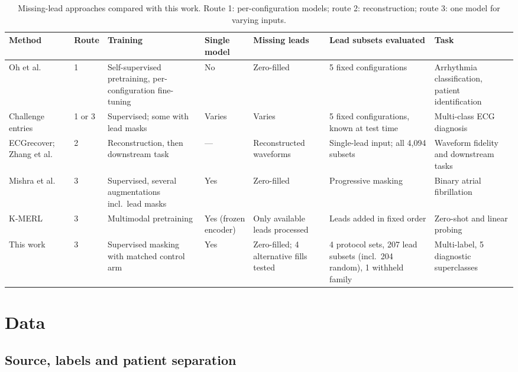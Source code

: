 \begin{table}[htbp]
\centering\footnotesize
\caption{Missing-lead approaches compared with this work. Route 1: per-configuration models; route 2: reconstruction; route 3: one model for varying inputs.}
\label{tab:related}
\setlength{\tabcolsep}{3pt}
\begin{tabular}{L{2.1cm}L{0.8cm}L{2.1cm}L{1.2cm}L{1.9cm}L{2.3cm}L{1.9cm}}
\toprule
Method & Route & Training & Single model & Missing leads & Lead subsets evaluated & Task \\
\midrule
Oh et al.\ \citep{oh2022leadagnostic} & 1 & Self-supervised pretraining, per-configuration fine-tuning & No & Zero-filled & 5 fixed configurations & Arrhythmia classification, patient identification \\
Challenge entries \citep{reyna2022issues} & 1 or 3 & Supervised; some with lead masks & Varies & Varies & 5 fixed configurations, known at test time & Multi-class ECG diagnosis \\
ECGrecover; Zhang et al.\ \citep{lence2025ecgrecover,zhang2026subsetbenchmark} & 2 & Reconstruction, then downstream task & --- & Reconstructed waveforms & Single-lead input; all 4,094 subsets & Waveform fidelity and downstream tasks \\
Mishra et al.\ \citep{fast2026af} & 3 & Supervised, several augmentations incl.\ lead masks & Yes & Zero-filled & Progressive masking & Binary atrial fibrillation \\
K-MERL \citep{liu2025kmerl} & 3 & Multimodal pretraining & Yes (frozen encoder) & Only available leads processed & Leads added in fixed order & Zero-shot and linear probing \\
This work & 3 & Supervised masking with matched control arm & Yes & Zero-filled; 4 alternative fills tested & 4 protocol sets, 207 lead subsets (incl.\ 204 random), 1 withheld family & Multi-label, 5 diagnostic superclasses \\
\bottomrule
\end{tabular}
\end{table}


\section{Data}

\subsection{Source, labels and patient separation}

